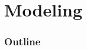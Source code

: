 
\section{Modeling}
\begin{frame}
  \frametitle{Outline}
  \tableofcontents[ currentsection ]
\end{frame}
